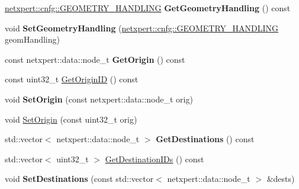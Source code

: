 \begin{DoxyCompactItemize}
\item 
\hyperlink{namespacenetxpert_1_1cnfg_a1514d3ae51414bf0bcd8d1fe8e868b89}{netxpert\+::cnfg\+::\+G\+E\+O\+M\+E\+T\+R\+Y\+\_\+\+H\+A\+N\+D\+L\+I\+NG} {\bfseries Get\+Geometry\+Handling} () const \hypertarget{classnetxpert_1_1ShortestPathTree_aef627a9c761474e1bad3152e29705f21}{}\label{classnetxpert_1_1ShortestPathTree_aef627a9c761474e1bad3152e29705f21}

\item 
void {\bfseries Set\+Geometry\+Handling} (\hyperlink{namespacenetxpert_1_1cnfg_a1514d3ae51414bf0bcd8d1fe8e868b89}{netxpert\+::cnfg\+::\+G\+E\+O\+M\+E\+T\+R\+Y\+\_\+\+H\+A\+N\+D\+L\+I\+NG} geom\+Handling)\hypertarget{classnetxpert_1_1ShortestPathTree_ad87ceadb7166f331e7ae66fe70126ff2}{}\label{classnetxpert_1_1ShortestPathTree_ad87ceadb7166f331e7ae66fe70126ff2}

\item 
const netxpert\+::data\+::node\+\_\+t {\bfseries Get\+Origin} () const \hypertarget{classnetxpert_1_1ShortestPathTree_aa760de850ca158259580031115c5eb08}{}\label{classnetxpert_1_1ShortestPathTree_aa760de850ca158259580031115c5eb08}

\item 
const uint32\+\_\+t \hyperlink{classnetxpert_1_1ShortestPathTree_a2902fa8ea1f028e3db1f30957fe80bb3}{Get\+Origin\+ID} () const 
\item 
void {\bfseries Set\+Origin} (const netxpert\+::data\+::node\+\_\+t orig)\hypertarget{classnetxpert_1_1ShortestPathTree_ab15a0c08e48a18ae0f9005ecc6b06f2e}{}\label{classnetxpert_1_1ShortestPathTree_ab15a0c08e48a18ae0f9005ecc6b06f2e}

\item 
void \hyperlink{classnetxpert_1_1ShortestPathTree_a8cdf595af07fc9a9cfd43519a61616ac}{Set\+Origin} (const uint32\+\_\+t orig)
\item 
std\+::vector$<$ netxpert\+::data\+::node\+\_\+t $>$ {\bfseries Get\+Destinations} () const \hypertarget{classnetxpert_1_1ShortestPathTree_a6f1682d49ced42f47cbc10377b89e8ed}{}\label{classnetxpert_1_1ShortestPathTree_a6f1682d49ced42f47cbc10377b89e8ed}

\item 
std\+::vector$<$ uint32\+\_\+t $>$ \hyperlink{classnetxpert_1_1ShortestPathTree_a0c58dd334c20fc9d9fc54788f5cd009d}{Get\+Destination\+I\+Ds} () const 
\item 
void {\bfseries Set\+Destinations} (const std\+::vector$<$ netxpert\+::data\+::node\+\_\+t $>$ \&dests)\hypertarget{classnetxpert_1_1ShortestPathTree_ade834f898cdb04271bf5a03761da5c29}{}\label{classnetxpert_1_1ShortestPathTree_ade834f898cdb04271bf5a03761da5c29}


\end{DoxyCompactItemize}

